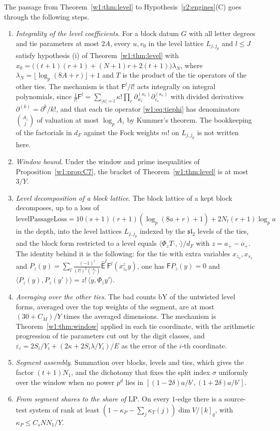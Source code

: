 The passage from Theorem~\ref{w1:thm:level} to Hypothesis~\ref{r2:engines}(C) goes through the following steps.

\begin{enumerate}[label=(C\arabic*),start=6,leftmargin=*]
\item \emph{Integrality of the level coefficients}. For a block datum $G$ with all letter degrees and tie parameters at most $2A$, every $u,v_0$ in the level lattice $L_{j,j_p}$ and $l\le J$ satisfy hypothesis (i) of Theorem~\ref{w1:thm:level} with $x_0=\big((t+1)(r+1)+(N+1)r+2(t+1)\big)\lambda_N$, where $\lambda_N=\lfloor\log_p(8A+r)\rfloor+1$ and $T$ is the product of the tie operators of the other ties. The mechanism is that $\mathsf F^l/l!$ acts integrally on integral polynomials, since $\frac1{l!}\mathsf F^l=\sum_{\lvert\kappa\rvert=l}\kappa!\prod_c\partial_{w_c}^{(\kappa_c)}\partial_{e_c}^{(\kappa_c)}$ with divided derivatives $\partial^{(k)}=\partial^k/k!$, and that each tie operator \eqref{w1:eq:tiephi} has denominators $\binom{A_z}j$ of valuation at most $\log_pA_z$ by Kummer's theorem. The bookkeeping of the factorials in $d_F$ against the Fock weights $m!$ on $L_{j,j_p}$ is not written here.
\item \emph{Window bound}. Under the window and prime inequalities of Proposition~\ref{w1:prop:C7}, the bracket of Theorem~\ref{w1:thm:level} is at most $3/Y$.
\item \emph{Level decomposition of a block lattice}. The block lattice of a kept block decomposes, up to a loss of $\mathrm{levelPassageLoss}=10(s+1)(r+1)(\log_p(8a+r)+1)+2N_t(r+1)\log_pa$ in the depth, into the level lattices $L_{j,j_p}$ indexed by the $\mathfrak{sl}_2$ levels of the ties, and the block form restricted to a level equals $\langle\Phi_{z}T\cdot,\cdot\rangle/d_F$ with $z=a_+-o_+$. The identity behind it is the following: for the tie with extra variables $x_{z_v},x_{s_v}$ and $P_z(y)=\sum_l\frac{(-1)^l}{(l!)^2\binom{A_z}l}\hat{\mathsf E}^l\mathsf F^l(x_{z_v}^zy)$, one has $\hat{\mathsf F}P_z(y)=0$ and $\langle P_z(y),P_z(y')\rangle=z!\,\langle y,\Phi_zy'\rangle$.
\item \emph{Averaging over the other ties}. The bad counts $\mathrm{bY}$ of the untwisted level forms, averaged over the top weights of the segment, are at most $(30+C_M)/Y$ times the averaged dimensions. The mechanism is Theorem~\ref{w1:thm:window} applied in each tie coordinate, with the arithmetic progression of tie parameters cut out by the digit classes, and $\varepsilon_i=2S_i/Y_i+(2\kappa+2S_i\lambda/Y_i)/E$ as the error of the $i$-th coordinate.
\item \emph{Segment assembly}. Summation over blocks, levels and ties, which gives the factor $(t+1)N_1$, and the dichotomy that fixes the split index $\sigma$ uniformly over the window when no power $p^d$ lies in $[(1-2\delta)a/b',(1+2\delta)a/b']$.
\item \emph{From segment shares to the share of} $\mathrm{LP}$. On every $1$-edge there is a source-test system of rank at least $(1-\kappa_P-\sum_j\kappa_T(j))\dim V/[k]_q$, with $\kappa_P\le C_sNN_1/Y$.
\end{enumerate}

